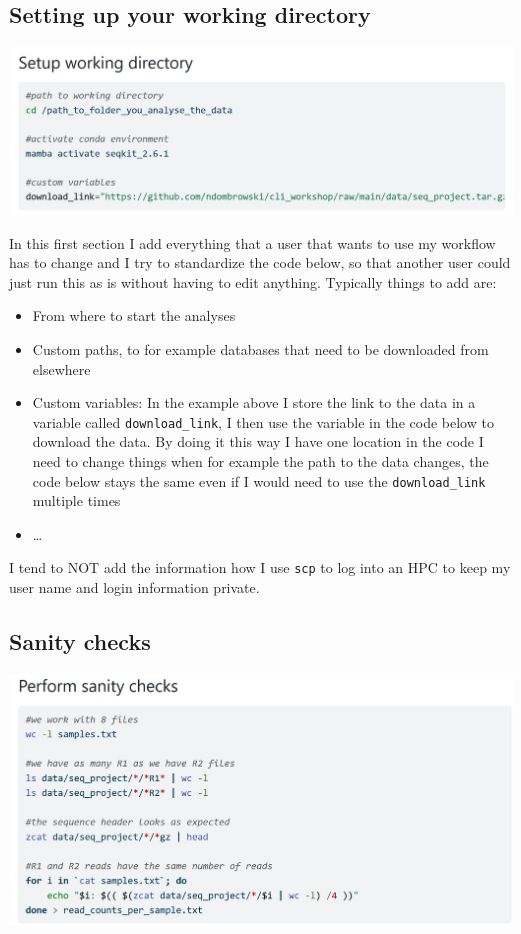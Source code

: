 \documentclass[
  letterpaper,
  DIV=11,
  numbers=noendperiod]{scrreprt}
\providecommand{\tightlist}{%
  \setlength{\itemsep}{0pt}\setlength{\parskip}{0pt}}\usepackage{longtable,booktabs,array}
\begin{document}
\subsection{Setting up your working
directory}\label{setting-up-your-working-directory}

\includegraphics[width=5.71875in,height=\textheight]{../img/general_setup.png}

In this first section I add everything that a user that wants to use my
workflow has to change and I try to standardize the code below, so that
another user could just run this as is without having to edit anything.
Typically things to add are:

\begin{itemize}
\tightlist
\item
  From where to start the analyses
\item
  Custom paths, to for example databases that need to be downloaded from
  elsewhere
\item
  Custom variables: In the example above I store the link to the data in
  a variable called \texttt{download\_link}, I then use the variable in
  the code below to download the data. By doing it this way I have one
  location in the code I need to change things when for example the path
  to the data changes, the code below stays the same even if I would
  need to use the \texttt{download\_link} multiple times
\item
  \ldots{}
\end{itemize}

I tend to NOT add the information how I use \texttt{scp} to log into an
HPC to keep my user name and login information private.

\subsection{Sanity checks}\label{sanity-checks}

\includegraphics[width=5.84375in,height=\textheight]{../img/sanity_check.png}
\end{document}
